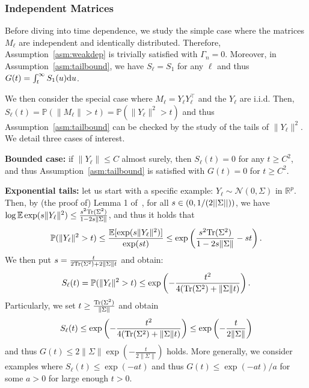 \documentclass[11pt,a4paper]{article}
\theoremstyle{remark}
\theoremstyle{definition}
\theoremstyle{definition}
\newcommand{\Ep}{\mathbb{E}}
\newcommand{\Surv}{S}
\newcommand{\rc}{\color{black}}
\begin{document}
\begin{bibunit}[apalike]
\subsubsection{Independent Matrices}
Before diving into time dependence, we study the simple case where the matrices $M_{\ell}$ are independent and identically distributed. Therefore, Assumption~\ref{asm:weakdep} is trivially satisfied with $\Gamma_n=0$. Moreover, in Assumption~\ref{asm:tailbound}, we have $\Surv_\ell=\Surv_1$ for any $\ell$ and thus $G(t) = \int_{t}^{\infty} \Surv_{1}(u) {\rm d} u $.


We then consider the special case where $M_\ell = Y_{\ell} Y_{\ell}^\top $ and the $Y_\ell$ are i.i.d. Then, $\Surv_{\ell }(t)  = \mathbb{P}( \|M_\ell\| > t ) = \mathbb{P}( \|Y_\ell\|^2 > t ) $ and thus Assumption~\ref{asm:tailbound} can be checked by the study of the tails of $\|Y_\ell\|^2$. We detail three cases of interest.


\textbf{Bounded case:} if $\|Y_\ell\| \leq C$ almost surely, then $\Surv_{\ell }(t) =0 $ for any $t\geq  C^2$, and thus Assumption~\ref{asm:tailbound} is satisfied with $G(t) = 0$ for $t\geq C^2$.


\textbf{Exponential tails:} let us start with a specific example: $Y_\ell\sim \mathcal{N}(0,\Sigma)$ in $\mathbb{R}^p$. Then, by (the proof of) Lemma 1 of~\cite{laurent2000adaptive}, for all $s\in(0,1/{\rc (2||\Sigma||)})$, we have $\log \mathbb{E} \exp( s \|Y_\ell\|^2 ) \leq \frac{s^2 {\rm Tr}(\Sigma^2) }{1-2 s \|\Sigma\| }$, 
and thus it holds that
\begin{align}    
\mathbb{P}(\|Y_\ell\|^2 > t )  \leq {\rc\frac{\Ep[\exp( s \|Y_\ell\|^2 )]}{\exp(st)}} \leq \exp\left( \frac{s^2 {\rm Tr}(\Sigma^2) }{1-2 s\|\Sigma\| } - st \right).
\end{align}
We then put $s = \frac{t}{2 {\rm Tr}(\Sigma^2) + 2 \|\Sigma\| t }$ and obtain:
$$
\Surv_\ell(t) = \mathbb{P}(\|Y_\ell\|^2 > t )  \leq \exp\left( -\frac{ t^2  }{4( {\rm Tr}(\Sigma^2) +  \|\Sigma\| t) } \right). $$
Particularly, we set $t\geq \frac{{\rm Tr}(\Sigma^2)}{\|\Sigma\|} $ and obtain
$$ \Surv_\ell(t) \leq \exp\left( -\frac{ t^2  }{4( {\rm Tr}(\Sigma^2) +  \|\Sigma\| t) } \right) \leq \exp\left( -\frac{ t  }{2 \|\Sigma\|  } \right) $$
and thus $G(t) \leq 2 \|\Sigma\| \exp( -\frac{t}{2\|\Sigma\|} )$ holds.
More generally, we consider examples where $ \Surv_\ell(t) \leq \exp(-at) $ and thus $G(t) \leq \exp(-at)/a$ for some $a>0$ for large enough $t > 0$.



\end{bibunit}
\end{document}
